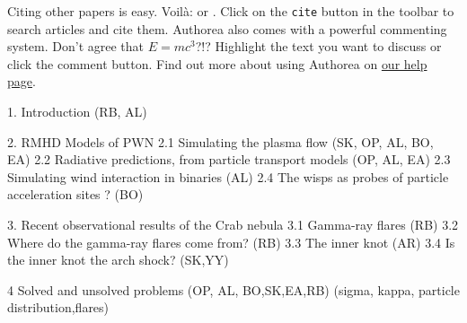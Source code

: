 Citing other papers is easy. Voilà: \cite{2012} or \cite{Holstein_2009}. Click on the \verb|cite| button in the toolbar to search articles and cite them. Authorea also comes with a powerful commenting system. Don't agree that $E  =  mc^{3}$?!? Highlight the text you want to discuss or click the comment button. Find out more about using Authorea on \href{https://www.authorea.com/help}{our help page}.

1. Introduction (RB, AL)

2.   RMHD Models of PWN
2.1 Simulating the plasma flow         (SK, OP, AL, BO, EA)
2.2 Radiative predictions, from particle transport models      (OP, AL, EA)
2.3 Simulating wind interaction in binaries             (AL)
2.4 The wisps as probes of  particle acceleration sites ? (BO)

3.   Recent observational results of the Crab nebula
3.1 Gamma-ray flares (RB)
3.2 Where do the gamma-ray flares come from?                  (RB)
3.3 The inner knot   (AR)
3.4 Is the inner knot the arch shock?                                      (SK,YY)

4   Solved and unsolved problems      (OP, AL, BO,SK,EA,RB)
(sigma, kappa, particle distribution,flares)